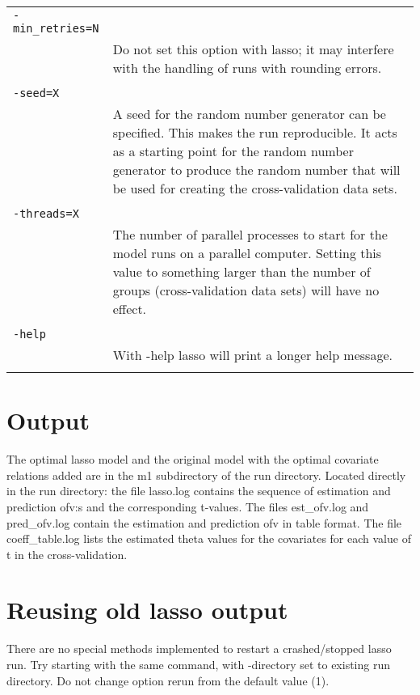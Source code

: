 \documentclass[a4paper,12pt]{article}
\begin{document}
\begin{longtable}{p{1in}p{4in}}
\\
\verb|-min_retries=N| & \\
\nopagebreak
 & Do not set this option with lasso; it may interfere with the handling of runs with rounding errors. \\
\\
\verb|-seed=X| & \\
\nopagebreak
 & A seed for the random number generator can be specified. This makes the run reproducible. It acts as a starting point for the random number generator to produce the random number that will be used for creating the cross-validation data sets. \\
\\
\verb|-threads=X| & \\
\nopagebreak
 & The number of parallel processes to start for the model runs on a parallel computer. Setting this value to something larger than the number of groups (cross-validation data sets) will have no effect. \\
\\
\verb|-help| & \\
\nopagebreak
 & With -help lasso will print a longer help message. \\
\\
\end{longtable}

\section{Output}

The optimal lasso model and the original model with the optimal covariate relations added are in the m1 subdirectory of the run directory. Located directly in the run directory: the file lasso.log contains the sequence of estimation and prediction ofv:s and the corresponding t-values. The files est\_ofv.log and pred\_ofv.log contain the estimation and prediction ofv in table format. The file coeff\_table.log lists the estimated theta values for the covariates for each value of t in the cross-validation.

\section{Reusing old lasso output}

There are no special methods implemented to restart a crashed/stopped lasso run. Try starting with the same command, with -directory set to existing run directory. Do not change option rerun from the default value (1).
\end{document}
